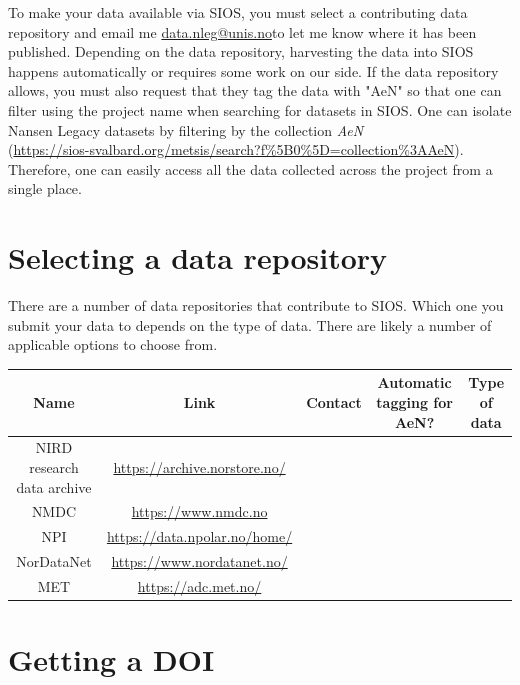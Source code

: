 \documentclass[a4paper,english, 11pt]{article}
\makeatletter
\newcommand{\emailme}{\href{mailto:data.nleg@unis.no}{data.nleg@unis.no}}
\makeatother
\begin{document}
To make your data available via SIOS, you must select a contributing data repository and email me \emailme to let me know where it has been published. Depending on the data repository, harvesting the data into SIOS happens automatically or requires some work on our side. If the data repository allows, you must also request that they tag the data with "AeN" so that one can filter using the project name when searching for datasets in SIOS. One can isolate Nansen Legacy datasets by filtering by the collection \textit{AeN} \\ 
(\href{https://sios-svalbard.org/metsis/search?f%5B0%5D=collection%3AAeN}{https://sios-svalbard.org/metsis/search?f\%5B0\%5D=collection\%3AAeN}). 
Therefore, one can easily access all the data collected across the project from a single place.  

\section{Selecting a data repository}
\label{s:repository}

There are a number of data repositories that contribute to SIOS. Which one you submit your data to depends on the type of data. There are likely a number of applicable options to choose from.

\begin{center}
\begin{tabular}{ |c|c|c|c|c| } 
\hline
Name & Link & Contact & Automatic tagging for AeN? & Type of data  \\
\hline
NIRD research data archive & \href{https://archive.norstore.no/}{https://archive.norstore.no/} & & & \\  
\hline
NMDC & \href{https://www.nmdc.no}{https://www.nmdc.no} & & & \\   
\hline
NPI & \href{https://data.npolar.no/home/}{https://data.npolar.no/home/} & & & \\   
\hline
NorDataNet & \href{https://www.nordatanet.no/}{https://www.nordatanet.no/} & & & \\   
\hline
MET & \href{https://adc.met.no/}{https://adc.met.no/} & & & \\   
\hline
\end{tabular}
\end{center}
 
\section{Getting a DOI}
\label{s:doi}
\end{document}
